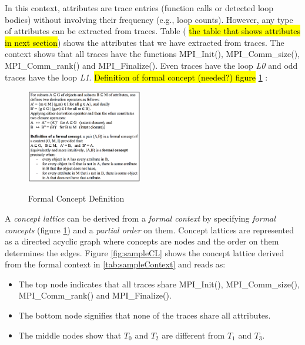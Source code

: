 %
In this context, attributes are trace entries (function calls or detected loop bodies) without involving their frequency (e.g., loop counts). However, any type of attributes can be extracted from traces. Table (\hl{ the table that shows attributes in next section}) shows the attributes that we have extracted from traces. The context shows that all traces have the functions MPI\_Init(), MPI\_Comm\_size(), MPI\_Comm\_rank() and MPI\_Finalize(). Even traces have the loop \textit{L0} and odd traces have the loop \textit{L1}.
%
\hl{Definition of formal concept (needed?) figure }\ref{fig:formalConceptDefinition} :

\begin{figure}[]
\centering
\caption{Formal Concept Definition}
\includegraphics[width=0.45\textwidth]{figs/formalConceptDefinition.png}
\label{fig:formalConceptDefinition}
\end{figure}

A \textit{concept lattice} can be derived  from a \textit{formal context} by specifying \textit{formal concepts} (figure \ref{fig:formalConceptDefinition}) and a \textit{partial order} on them. Concept lattices are represented as a directed acyclic graph where concepts are nodes and the order on them determines the edges.
%
Figure \ref{fig:sampleCL} shows the concept lattice derived from the formal context in \ref{tab:sampleContext} and reads as:

\begin{itemize}
    \item The top node indicates that all traces share MPI\_Init(), MPI\_Comm\_size(), MPI\_Comm\_rank() and MPI\_Finalize().
    \item The bottom node signifies that none of the traces share all attributes. 
    \item The middle nodes show that $T_0$ and $T_2$ are different from  $T_1$ and $T_3$.
\end{itemize}




